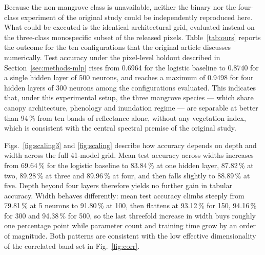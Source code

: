 \documentclass[10pt,twocolumn,a4paper]{article}
\begin{document}
Because the non-mangrove class is unavailable, neither the binary nor the four-class experiment of
the original study could be independently reproduced here. What could be executed is the identical
architectural grid, evaluated instead on the three-class monospecific subset of the released
pixels. Table~\ref{tab:ours} reports the outcome for the ten configurations that the original
article discusses numerically. Test accuracy under the pixel-level holdout described in
Section~\ref{sec:methods-mlp} rises from 0.6964 for the logistic baseline to 0.8740 for a single hidden layer of 500
neurons, and reaches a maximum of 0.9498 for four hidden layers of 300 neurons among the
configurations evaluated. This indicates that, under this experimental setup, the three mangrove
species --- which share canopy architecture, phenology and inundation regime --- are separable at
better than 94\,\% from ten bands of reflectance alone, without any vegetation index, which is
consistent with the central spectral premise of the original study.

Figs.~\ref{fig:scaling3} and \ref{fig:scaling} describe how accuracy depends on depth and width
across the full 41-model grid. Mean test accuracy across widths increases from 69.64\,\% for the
logistic baseline to 83.84\,\% at one hidden layer, 87.82\,\% at two, 89.28\,\% at three and
89.96\,\% at four, and then falls slightly to 88.89\,\% at five. Depth beyond four layers
therefore yields no further gain in tabular accuracy. Width behaves differently: mean test accuracy
climbs steeply from 79.81\,\% at 5 neurons to 91.80\,\% at 100, then flattens at 93.12\,\% for
150, 94.16\,\% for 300 and 94.38\,\% for 500, so the last threefold increase in width buys roughly
one percentage point while parameter count and training time grow by an order of magnitude. Both
patterns are consistent with the low effective dimensionality of the correlated band set in
Fig.~\ref{fig:corr}.
\end{document}
